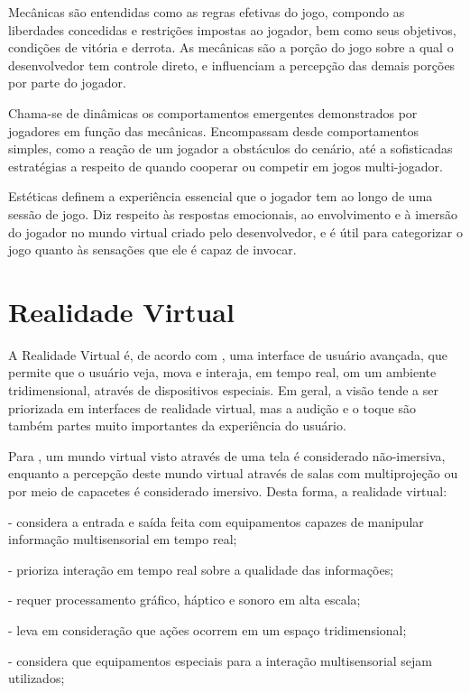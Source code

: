 Mecânicas são entendidas como as regras efetivas do jogo, compondo as liberdades
concedidas e restrições impostas ao jogador, bem como seus objetivos, condições de
vitória e derrota. As mecânicas são a porção do jogo sobre a qual o desenvolvedor tem
controle direto, e influenciam a percepção das demais porções por parte do jogador.

Chama-se de dinâmicas os comportamentos emergentes demonstrados por jogadores em 
função das mecânicas. Encompassam desde comportamentos simples, como a reação de um
jogador a obstáculos do cenário, até a sofisticadas estratégias a respeito de quando
cooperar ou competir em jogos multi-jogador.

Estéticas definem a experiência essencial que o jogador tem ao longo de uma sessão de
jogo. Diz respeito às respostas emocionais, ao envolvimento e à imersão do jogador no
mundo virtual criado pelo desenvolvedor, e é útil para categorizar o jogo quanto às
sensações que ele é capaz de invocar.


\section{Realidade Virtual}\label{sec-realidadevirtual}

A Realidade Virtual é, de acordo com \cite{kirner:2007:RV_e_RA}, uma interface de
usuário avançada, que permite que o usuário veja, mova e interaja, em tempo real, 
om um ambiente tridimensional, através de dispositivos especiais. Em geral, a visão
tende a ser priorizada em interfaces de realidade virtual, mas a audição e o toque 
são também partes muito importantes da experiência do usuário.

Para \cite{kirner:2011:evolucao_RV}, um mundo virtual visto através de uma tela é
considerado não-imersiva, enquanto a percepção deste mundo virtual através de salas 
com multiprojeção ou por meio de capacetes é considerado imersivo. Desta forma, a
realidade virtual:

- considera a entrada e saída feita com equipamentos capazes de manipular 
informação multisensorial em tempo real;

- prioriza interação em tempo real sobre a qualidade das informações;

- requer processamento gráfico, háptico e sonoro em alta escala;

- leva em consideração que ações ocorrem em um espaço tridimensional;

- considera que equipamentos especiais para a interação multisensorial sejam
utilizados;

